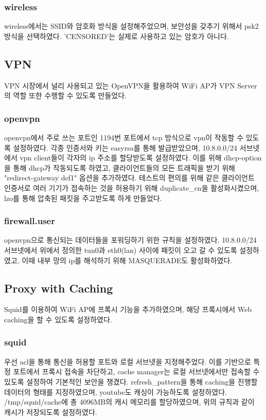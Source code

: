 \documentclass{article}
\begin{document}
    \subsubsection{wireless}
    wireless에서는 SSID와 암호화 방식을 설정해주었으며, 보안성을 갖추기 위해서 psk2 방식을 선택하였다. 'CENSORED'는 실제로 사용하고 있는 암호가 아니다.



    \subsection{VPN}
     VPN 시장에서 널리 사용되고 있는 OpenVPN을 활용하여 WiFi AP가 VPN Server의 역할 또한 수행할 수 있도록 만들었다.
    \subsubsection{openvpn}
    openvpn에서 주로 쓰는 포트인 1194번 포트에서 tcp 방식으로 vpn이 작동할 수 있도록 설정하였다.
    각종 인증서와 키는 easyrsa를 통해 발급받았으며, 10.8.0.0/24 서브넷에서 vpn client들이 각자의 ip 주소를 할당받도록 설정하였다.
    이를 위해 dhcp-option을 통해 dhcp가 작동되도록 하였고, 클라이언트들의 모든 트래픽을 받기 위해 "redirect-gateway def1" 옵션을 추가하였다.
    테스트의 편의를 위해 같은 클라이언트 인증서로 여러 기기가 접속하는 것을 허용하기 위해 duplicate\_cn을 활성화시켰으며, lzo를 통해 압축된 패킷을 주고받도록 하게 만들었다.
    \subsubsection{firewall.user}
    openvpn으로 통신되는 데이터들을 포워딩하기 위한 규칙을 설정하였다. 10.8.0.0/24 서브넷에서 위에서 정의한 tun0과 eth0(lan) 사이에 패킷이 오고 갈 수 있도록 설정하였고,
    이때 내부 망의 ip를 해석하기 위해 MASQUERADE도 활성화하였다.

    \subsection{Proxy with Caching}
     Squid를 이용하여 WiFi AP에 프록시 기능을 추가하였으며, 해당 프록시에서 Web caching을 할 수 있도록 설정하였다.
    \subsubsection{squid}
    우선 acl을 통해 통신을 허용할 포트와 로컬 서브넷을 지정해주었다.
    이를 기반으로 특정 포트에서 프록시 접속을 차단하고, cache manager는 로컬 서브넷에서만 접속할 수 있도록 설정하여 기본적인 보안을 챙겼다.
    refresh\_pattern을 통해 caching을 진행할 데이터의 형태를 지정하였으며, youtube도 캐싱이 가능하도록 설정하였다.
    /tmp/squid/cache에 총 4096MB의 캐시 메모리를 할당하였으며, 위의 규칙과 같이 캐시가 저장되도록 설정하였다.
\end{document}
